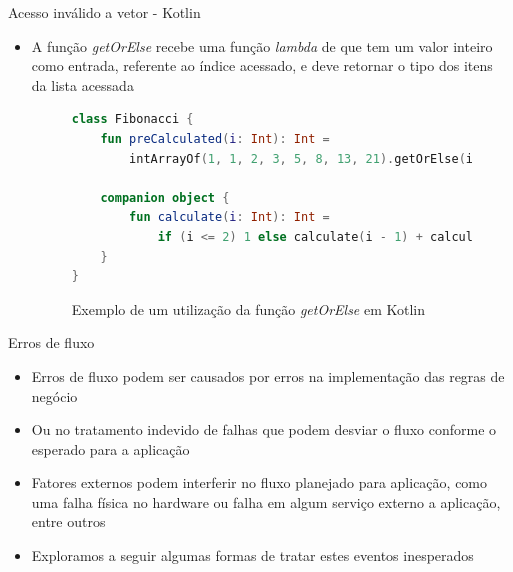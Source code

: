 \documentclass[brazilian]{beamer}
\begin{document}
\begin{frame}[fragile]{Acesso inválido a vetor - Kotlin}
    \begin{itemize}
        \item A função \emph{getOrElse} recebe uma função \textit{lambda} de que 
        tem um valor inteiro como entrada, referente ao índice acessado, e deve retornar o tipo dos itens da lista acessada
        \begin{figure}[H]
            \centering
            \begin{lstlisting}[language=Kotlin]
class Fibonacci {
    fun preCalculated(i: Int): Int = 
        intArrayOf(1, 1, 2, 3, 5, 8, 13, 21).getOrElse(i) { calculate(it) }

    companion object {
        fun calculate(i: Int): Int = 
            if (i <= 2) 1 else calculate(i - 1) + calculate(i - 2)
    }
}
            \end{lstlisting}
            \caption{Exemplo de um utilização da função \textit{getOrElse} em Kotlin}
            \label{fig:kotlin_get_or_else_array_access}
        \end{figure}
    \end{itemize}
\end{frame}

\begin{frame}{Erros de fluxo}
    \begin{itemize}
        \item Erros de fluxo podem ser causados por erros na implementação das regras de negócio
        \item Ou no tratamento indevido de falhas que podem desviar o fluxo conforme o esperado para a aplicação
        \item Fatores externos podem interferir no fluxo planejado para aplicação, como uma falha física no hardware ou falha em algum serviço externo a aplicação, entre outros
        \item Exploramos a seguir algumas formas de tratar estes eventos inesperados
    \end{itemize}
\end{frame}
\end{document}
